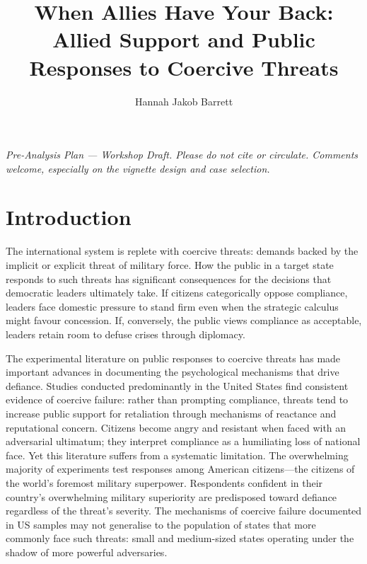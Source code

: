 

\title{When Allies Have Your Back:\\
Allied Support and Public Responses to Coercive Threats}

\author{Hannah Jakob Barrett}


\maketitle

\textit{Pre-Analysis Plan --- Workshop Draft. Please do not cite or circulate. Comments welcome, especially on the vignette design and case selection.}

\newpage

\section{Introduction}

The international system is replete with coercive threats: demands backed by the implicit or explicit threat of military force. How the public in a target state responds to such threats has significant consequences for the decisions that democratic leaders ultimately take. If citizens categorically oppose compliance, leaders face domestic pressure to stand firm even when the strategic calculus might favour concession. If, conversely, the public views compliance as acceptable, leaders retain room to defuse crises through diplomacy.

The experimental literature on public responses to coercive threats has made important advances in documenting the psychological mechanisms that drive defiance. Studies conducted predominantly in the United States find consistent evidence of coercive failure: rather than prompting compliance, threats tend to increase public support for retaliation through mechanisms of reactance and reputational concern.\autocite{dafoe_coercion_2021, dafoe_provocation_2022, powers_psychology_2023} Citizens become angry and resistant when faced with an adversarial ultimatum; they interpret compliance as a humiliating loss of national face. Yet this literature suffers from a systematic limitation. The overwhelming majority of experiments test responses among American citizens---the citizens of the world's foremost military superpower. Respondents confident in their country's overwhelming military superiority are predisposed toward defiance regardless of the threat's severity. The mechanisms of coercive failure documented in US samples may not generalise to the population of states that more commonly face such threats: small and medium-sized states operating under the shadow of more powerful adversaries.

